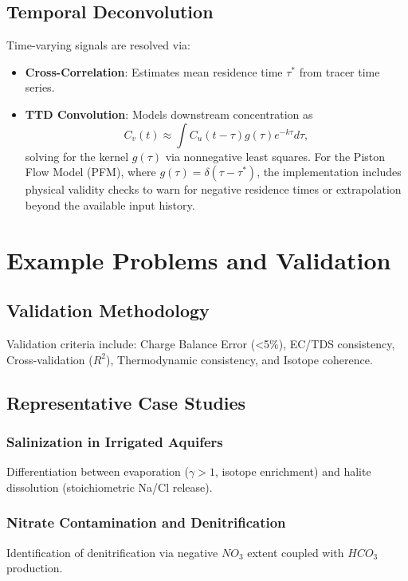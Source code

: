 \documentclass[12pt,a4paper]{article}
\theoremstyle{plain}
\theoremstyle{definition}
\theoremstyle{remark}
\begin{document}
\subsection{Temporal Deconvolution}\label{sec:temporal_deconvolution}
Time-varying signals are resolved via:
\begin{itemize}
	\item \textbf{Cross-Correlation}: Estimates mean residence time $\tau^*$ from tracer time series.
	\item \textbf{TTD Convolution}: Models downstream concentration as
	      \[C_v(t) \approx \int C_u(t-\tau) g(\tau) e^{-k\tau} d\tau,\]
	      solving for the kernel $g(\tau)$ via nonnegative least squares. For the Piston Flow Model (PFM), where $g(\tau) = \delta(\tau - \tau^*)$, the implementation includes physical validity checks to warn for negative residence times or extrapolation beyond the available input history.
\end{itemize}

\newpage

\section{Example Problems and Validation}\label{sec:results}

\subsection{Validation Methodology}\label{sec:validation}
Validation criteria include: Charge Balance Error (<5\%), EC/TDS consistency, Cross-validation ($R^2$), Thermodynamic consistency, and Isotope coherence.

\subsection{Representative Case Studies}\label{sec:case_studies}
\subsubsection{Salinization in Irrigated Aquifers}
Differentiation between evaporation ($\gamma > 1$, isotope enrichment) and halite dissolution (stoichiometric Na/Cl release).

\subsubsection{Nitrate Contamination and Denitrification}
Identification of denitrification via negative $NO_3$ extent coupled with $HCO_3$ production.
\end{document}
